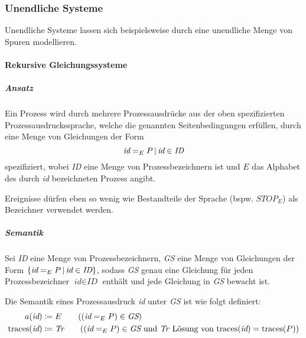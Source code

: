 		    \subsubsection{Unendliche Systeme}
			    Unendliche Systeme lassen sich beispielsweise durch eine unendliche Menge von Spuren modellieren.
			    
			    \paragraph{Rekursive Gleichungssysteme}
				    \subparagraph{Ansatz}
					    Ein Prozess wird durch mehrere Prozessausdrücke aus der oben spezifizierten Prozessausdruckssprache, welche die genannten Seitenbedingungen erfüllen, durch eine Menge von Gleichungen der Form \[ \textit{id} = _ E P \,\vert\, \textit{id} \in \textit{ID} \] spezifiziert, wobei \textit{ID} eine Menge von Prozessbezeichnern ist und $ E $  das Alphabet des durch \textit{id} bezeichneten Prozess angibt.
					    
					    Ereignisse dürfen eben so wenig wie Bestandteile der Sprache (bspw. $ \textit{STOP} _ E $) als Bezeichner verwendet werden.
					    
					    
				    
					\subparagraph{Semantik}
						Sei \textit{ID} eine Menge von Prozessbezeichnern, \textit{GS} eine Menge von Gleichungen der Form $ \{ \textit{id} = _ E P \,\vert\, \textit{id} \in \textit{ID} \} $, sodass \textit{GS} genau eine Gleichung für jeden Prozessbezeichner $ \textit{id} \in \textit{ID} $ enthält und jede Gleichung in \textit{GS} bewacht ist.
						
						Die Semantik eines Prozessausdruck \textit{id} unter \textit{GS} ist wie folgt definiert:
						\begin{align*}
							a(\textit{id}) &\coloneqq E \tag{$ (\textit{id} = _ E P) \in \textit{GS} $} \\
							\text{traces}(\textit{id}) &\coloneqq \textit{Tr} \tag{$ (\textit{id} = _ E P) \in \textit{GS} $ und \textit{Tr} Lösung von $ \text{traces}(\textit{id}) = \text{traces}(P) $} \\
						\end{align*}
    
